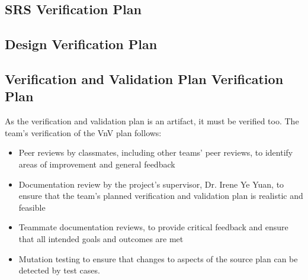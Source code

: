 \documentclass[12pt, titlepage]{article}
\begin{document}
\subsection{SRS Verification Plan}




\subsection{Design Verification Plan}




\subsection{Verification and Validation Plan Verification Plan}

As the verification and validation plan is an artifact, it must be verified too. The team's verification of the VnV plan follows:
\begin{itemize}
  \item Peer reviews by classmates, including other teams' peer reviews, to identify areas of improvement and general feedback
  \item Documentation review by the project's supervisor, Dr. Irene Ye Yuan, to ensure that the team's planned verification and validation plan is realistic and feasible
  \item Teammate documentation reviews, to provide critical feedback and ensure that all intended goals and outcomes are met
  \item Mutation testing to ensure that changes to aspects of the source plan can be detected by test cases.
\end{itemize}
\end{document}
